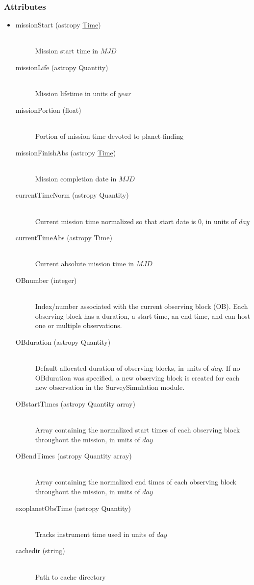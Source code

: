 \documentclass[cleanfoot]{asme2ej}
\begin{document}
\subsubsection*{Attributes}
\begin{itemize}
\item
\begin{description}
    \item[missionStart (astropy \href{http://astropy.readthedocs.org/en/latest/time/index.html}{Time})] \hfill \\
        Mission start time in $ MJD $
    \item[missionLife (astropy Quantity)] \hfill \\ Mission lifetime in units of $ year $
    \item[missionPortion (float)] \hfill \\ Portion of mission time devoted to planet-finding
    \item[missionFinishAbs (astropy \href{http://astropy.readthedocs.org/en/latest/time/index.html}{Time})] \hfill \\ Mission completion date in $ MJD $
    \item[currentTimeNorm (astropy Quantity)] \hfill \\ Current mission time normalized so that start date is 0, in units of $ day $
    \item[currentTimeAbs (astropy \href{http://astropy.readthedocs.org/en/latest/time/index.html}{Time})] \hfill \\ Current absolute mission time in $ MJD $
    \item[OBnumber (integer)] \hfill \\ Index/number associated with the current observing block (OB). Each observing block has a duration, a start time, an end time, and can host one or multiple observations.
    \item[OBduration (astropy Quantity)] \hfill \\ Default allocated duration of observing blocks, in units of $day$. If no OBduration was specified, a new observing block is created for each new observation in the SurveySimulation module. 
    \item[OBstartTimes (astropy Quantity array)] \hfill \\ Array containing the normalized start times of each observing block throughout the mission, in units of $day$
    \item[OBendTimes (astropy Quantity array)] \hfill \\ Array containing the normalized end times of each observing block throughout the mission, in units of $day$
    \item[exoplanetObsTime (astropy Quantity)] \hfill \\ Tracks instrument time used in units of $day$
    \item[cachedir (string)] \hfill \\ Path to cache directory
\end{description}
\end{itemize}
\end{document}
